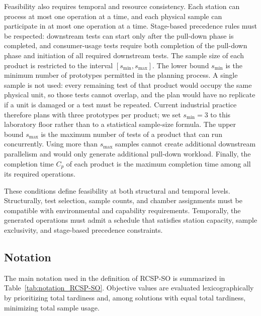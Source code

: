\documentclass[11pt]{article}
\begin{document}
Feasibility also requires temporal and resource consistency. Each station can process at most one operation at a time, and each physical sample can participate in at most one operation at a time. Stage-based precedence rules must be respected: downstream tests can start only after the pull-down phase is completed, and consumer-usage tests require both completion of the pull-down phase and initiation of all required downstream tests. The sample size of each product is restricted to the interval \([s_{\min},s_{\max}]\). The lower bound \(s_{\min}\) is the minimum number of prototypes permitted in the planning process. A single sample is not used: every remaining test of that product would occupy the same physical unit, so those tests cannot overlap, and the plan would have no replicate if a unit is damaged or a test must be repeated. Current industrial practice therefore plans with three prototypes per product; we set \(s_{\min}=3\) to this laboratory floor rather than to a statistical sample-size formula. The upper bound \(s_{\max}\) is the maximum number of tests of a product that can run concurrently. Using more than \(s_{\max}\) samples cannot create additional downstream parallelism and would only generate additional pull-down workload. Finally, the completion time \(C_p\) of each product is the maximum completion time among all its required operations.

These conditions define feasibility at both structural and temporal levels. Structurally, test selection, sample counts, and chamber assignments must be compatible with environmental and capability requirements. Temporally, the generated operations must admit a schedule that satisfies station capacity, sample exclusivity, and stage-based precedence constraints.

\subsection{Notation}
\label{subsec:notation}

The main notation used in the definition of RCSP-SO is summarized in Table~\ref{tab:notation_RCSP-SO}. Objective values are evaluated lexicographically by prioritizing total tardiness and, among solutions with equal total tardiness, minimizing total sample usage.
\end{document}
